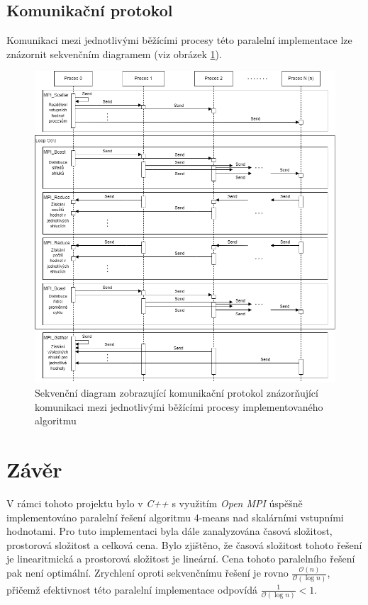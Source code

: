 \documentclass[a4paper]{article}
\newcommand{\bigO}[1]{\mathcal{O}(#1)}
\begin{document}
\subsection*{Komunikační protokol}



Komunikaci mezi jednotlivými běžícími procesy této paralelní implementace lze znázornit sekvenčním diagramem (viz obrázek \ref{pic:4-means:seq-diagram}).

\begin{figure}[h]
	\centering
	\includegraphics[scale=0.52]{komunikacni-protokol.png}
	\caption{Sekvenční diagram zobrazující komunikační protokol znázorňující komunikaci mezi jednotlivými běžícími procesy implementovaného algoritmu}\label{pic:4-means:seq-diagram}
\end{figure}



\section{Závěr}



V rámci tohoto projektu bylo v \textit{C++} s využitím \textit{Open MPI} úspěšně implementováno paralelní řešení algoritmu 4-means nad skalárními vstupními hodnotami. Pro tuto implementaci byla dále zanalyzována časová složitost, prostorová složitost a celková cena. Bylo zjištěno, že časová složitost tohoto řešení je linearitmická a prostorová složitost je lineární. Cena tohoto paralelního řešení pak není optimální. Zrychlení oproti sekvenčnímu řešení je rovno $\frac{\bigO{n}}{\bigO{\log n}}$, přičemž efektivnost této paralelní implementace odpovídá $\frac{1}{\bigO{\log n}} < 1$.
\end{document}
